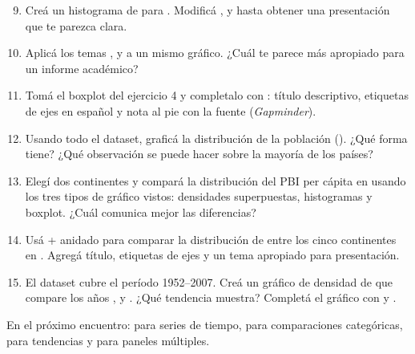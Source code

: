 \documentclass[8pt]{beamer}
\begin{document}
	\begin{frame}[fragile]
		\begin{enumerate}
			\setcounter{enumi}{8}
			\item Creá un histograma de  para . Modificá ,  y  hasta obtener una presentación que te parezca clara.
			\item Aplicá los temas ,  y  a un mismo gráfico. ¿Cuál te parece más apropiado para un informe académico?
			\item Tomá el boxplot del ejercicio 4 y completalo con : título descriptivo, etiquetas de ejes en español y nota al pie con la fuente (\textit{Gapminder}).
			\item Usando todo el dataset, graficá la distribución de la población (). ¿Qué forma tiene? ¿Qué observación se puede hacer sobre la mayoría de los países?
			\item Elegí dos continentes y compará la distribución del PBI per cápita en  usando los tres tipos de gráfico vistos: densidades superpuestas, histogramas y boxplot. ¿Cuál comunica mejor las diferencias?
			\item Usá  +  anidado para comparar la distribución de  entre los cinco continentes en . Agregá título, etiquetas de ejes y un tema apropiado para presentación.
			\item El dataset cubre el período 1952--2007. Creá un gráfico de densidad de  que compare los años ,  y . ¿Qué tendencia muestra? Completá el gráfico con  y .
		\end{enumerate}
		
		\begin{exampleblock}{}
			En el próximo encuentro:  para series de tiempo,  para comparaciones categóricas,  para tendencias y  para paneles múltiples.
		\end{exampleblock}
	\end{frame}
\end{document}
